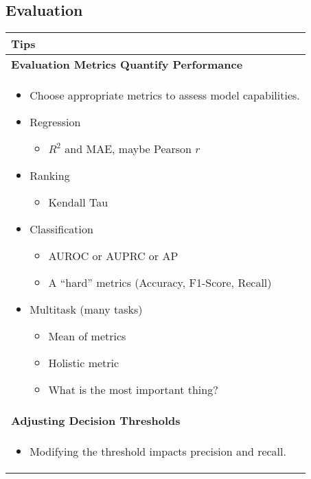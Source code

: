 \subsection{Evaluation}
\begin{summary}
    \begin{center}
        \begin{tabular}{l}
        \toprule
        \textbf{Tips} \\
        \midrule
        \textbf{Evaluation Metrics Quantify Performance} \\
        \multicolumn{1}{p{\linewidth}}{
        \begin{itemize}
            \item Choose appropriate metrics to assess model capabilities. 
            \item Regression
            \begin{itemize}
                \item \( R^2 \) and MAE, maybe Pearson \( r \)
            \end{itemize}
            \item Ranking
            \begin{itemize}
                \item Kendall Tau
            \end{itemize}
            \item Classification
            \begin{itemize}
                \item AUROC or AUPRC or AP
                \item A ``hard'' metrics (Accuracy, F1-Score, Recall)
            \end{itemize}
            \item Multitask (many tasks)
            \begin{itemize}
                \item Mean of metrics
                \item Holistic metric
                \item What is the most important thing?
            \end{itemize}
        \end{itemize}} \\
        \midrule
        \textbf{Adjusting Decision Thresholds} \\
        \multicolumn{1}{p{\linewidth}}{
        \begin{itemize}
            \item Modifying the threshold impacts precision and recall. 

\end{itemize}}
\end{tabular}
\end{center}
\end{summary}
